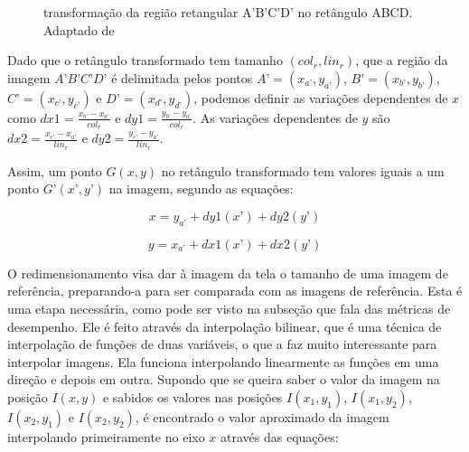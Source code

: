 
\begin{figure}[h]
  \centering
  \hfill
  \caption{transformação da região retangular A'B'C'D' no retângulo ABCD. Adaptado de \cite{inspect}}
  \label{redimens}
\end{figure} 


Dado que o retângulo transformado tem tamanho $(col_r,lin_r)$, que a região da imagem $A’B’C’D’$ é delimitada pelos pontos $A’ = (x_{a’},y_{a’})$, $B’ = (x_{b’},y_{b’})$, $C’ = (x_{c’},y_{c’})$ e $D’ = (x_{d’},y_{d’})$, podemos definir as variações dependentes de $x$ como $dx1 = \frac{x_{b’}-x_{a’}}{col_r}$ e $dy1 = \frac{y_{b’}-y_{a’}}{col_r}$. As variações dependentes de $y$ são $dx2 = \frac{x_{c’}-x_{a’}}{lin_r}$ e $dy2 = \frac{y_{c’}-y_{a’}}{lin_r}$.


Assim, um ponto $G(x,y)$ no retângulo transformado tem valores iguais a um ponto $G’(x’,y’)$ na imagem, segundo as equações:

$$ x = y_{a’} + dy1(x’) + dy2(y’) $$

$$ y = x_{a’} + dx1(x’) + dx2(y’) $$

O redimensionamento visa dar à imagem da tela o tamanho de uma imagem de referência, preparando-a para ser comparada com as imagens de referência. Esta é uma etapa necessária, como pode ser visto na subseção que fala das métricas de desempenho. Ele é feito através da interpolação bilinear, que é uma técnica de interpolação de funções de duas variáveis, o que a faz muito interessante para interpolar imagens.
Ela funciona interpolando linearmente as funções em uma direção e depois em outra. Supondo que se queira saber o valor da imagem na posição $I(x,y)$ e sabidos os valores nas posições $I(x_1,y_1)$, $I(x_1,y_2)$, $I(x_2,y_1)$ e $I(x_2,y_2)$, é encontrado o valor aproximado da imagem interpolando primeiramente no eixo $x$ através das equações:

